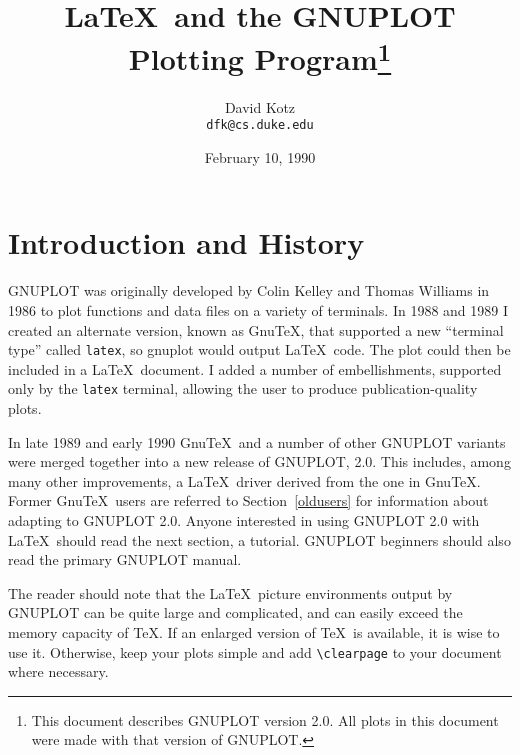 % 
%
%





\title{\LaTeX\ and the GNUPLOT Plotting 
Program\thanks{This document describes GNUPLOT version 2.0. All plots
in this document were made with that version of GNUPLOT.} }
\author{David Kotz \\ \verb+dfk@cs.duke.edu+}
\date{February 10, 1990}

\maketitle

\pagestyle{myheadings}

\currentspace %

\section{Introduction and History}

GNUPLOT was originally developed by Colin Kelley and Thomas Williams
in 1986 to plot functions and data files on a variety of terminals.
In 1988 and 1989 I created an alternate version, known as Gnu\TeX,
that supported a new ``terminal type'' called {\tt latex}, so gnuplot
would output \LaTeX\ code. The plot could then be included in a
\LaTeX\ document. I added a number of embellishments, supported only
by the {\tt latex} terminal, allowing the user to produce
publication-quality plots.

In late 1989 and early 1990 Gnu\TeX\ and a number of other GNUPLOT
variants were merged together into a new release of GNUPLOT, 2.0. This
includes, among many other improvements, a \LaTeX\ driver derived from
the one in Gnu\TeX. Former Gnu\TeX\ users are referred to
Section~\ref{oldusers} for information about adapting to GNUPLOT 2.0.
Anyone interested in using GNUPLOT 2.0 with \LaTeX\ should read the
next section, a tutorial.  GNUPLOT beginners should also read the
primary GNUPLOT manual. 

The reader should note that the \LaTeX\ picture environments output by
GNUPLOT can be quite large and complicated, and can easily exceed the
memory capacity of \TeX. If an enlarged version of \TeX\ is available,
it is wise to use it. Otherwise, keep your plots simple and add
\verb+\clearpage+ to your document where necessary.

